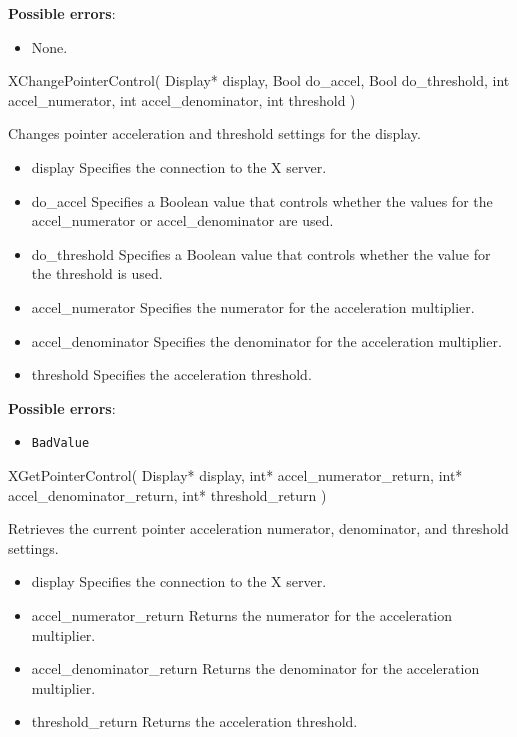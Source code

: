 \documentclass{report}
\begin{document}
\begin{itemize}
        \textbf{Possible errors}:
        \begin{itemize}
            \item None.
        \end{itemize}

        \begin{cppcode}
        XChangePointerControl(
            Display* display,
            Bool do_accel,
            Bool do_threshold,
            int accel_numerator,
            int accel_denominator,
            int threshold
        )
        \end{cppcode}
        \bigbreak \noindent
        Changes pointer acceleration and threshold settings for the display.

        \begin{itemize}
            \item display Specifies the connection to the X server.
            \item do\_accel Specifies a Boolean value that controls whether the values for the accel\_numerator or accel\_denominator are used.
            \item do\_threshold Specifies a Boolean value that controls whether the value for the threshold is used.
            \item accel\_numerator Specifies the numerator for the acceleration multiplier.
            \item accel\_denominator Specifies the denominator for the acceleration multiplier.
            \item threshold Specifies the acceleration threshold.
        \end{itemize}

        \textbf{Possible errors}:
        \begin{itemize}
            \item \texttt{BadValue}
        \end{itemize}

        \begin{cppcode}
        XGetPointerControl(
            Display* display,
            int* accel_numerator_return,
            int* accel_denominator_return,
            int* threshold_return
        )
        \end{cppcode}
        \bigbreak \noindent
        Retrieves the current pointer acceleration numerator, denominator, and threshold settings.

        \begin{itemize}
            \item display Specifies the connection to the X server.
            \item accel\_numerator\_return Returns the numerator for the acceleration multiplier.
            \item accel\_denominator\_return Returns the denominator for the acceleration multiplier.
            \item threshold\_return Returns the acceleration threshold.
        \end{itemize}


\end{itemize}
\end{document}
